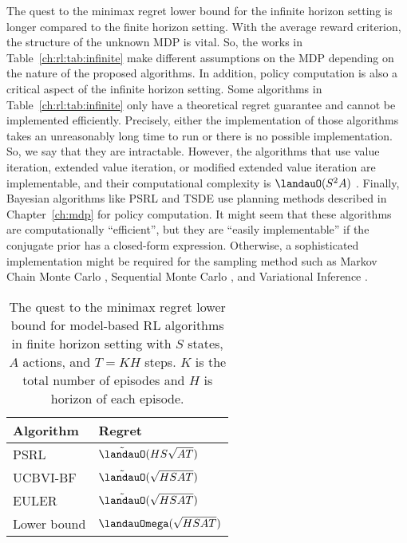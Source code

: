 The quest to the minimax regret lower bound for the infinite horizon setting is longer compared to the finite horizon setting.
With the average reward criterion, the structure of the unknown MDP is vital.
So, the works in Table~\ref{ch:rl:tab:infinite} make different assumptions on the MDP depending on the nature of the proposed algorithms.
In addition, policy computation is also a critical aspect of the infinite horizon setting.
Some algorithms in Table~\ref{ch:rl:tab:infinite} only have a theoretical regret guarantee and cannot be implemented efficiently.
Precisely, either the implementation of those algorithms takes an unreasonably long time to run or there is no possible implementation.
So, we say that they are intractable.
However, the algorithms that use value iteration, extended value iteration, or modified extended value iteration are implementable, and their computational complexity is $\landauO(S^2A)$ \cite{jaksch2010near}.
Finally, Bayesian algorithms like PSRL and TSDE use planning methods described in Chapter~\ref{ch:mdp} for policy computation.
It might seem that these algorithms are computationally ``efficient'', but they are ``easily implementable'' if the conjugate prior has a closed-form expression.
Otherwise, a sophisticated implementation might be required for the sampling method such as Markov Chain Monte Carlo \cite{andrieu2003introduction}, Sequential Monte Carlo \cite{doucet2009tutorial}, and Variational Inference \cite{blei2017variational}.
\begin{table}[htbp]
    \centering
\begin{tabular}{|l|l|}
\hline
Algorithm & Regret \\ \hline
PSRL \cite{osband2013more}  & $\tilde{\landauO}(HS\sqrt{AT})$ \\ 
UCBVI-BF \cite{azar2017minimax}  & $\tilde{\landauO}(\sqrt{HSAT})$ \\ 
EULER \cite{zanette2019tighter}        & $\tilde{\landauO}(\sqrt{HSAT})$ \\ \hline
Lower bound & $\landauOmega(\sqrt{HSAT})$ \cite{jaksch2010near} \\ \hline
\end{tabular}
\caption{The quest to the minimax regret lower bound for model-based RL algorithms in finite horizon setting with $S$ states, $A$ actions, and $T=KH$ steps.
$K$ is the total number of episodes and $H$ is horizon of each episode.
}
\label{ch:rl:tab:finite}
\end{table}

